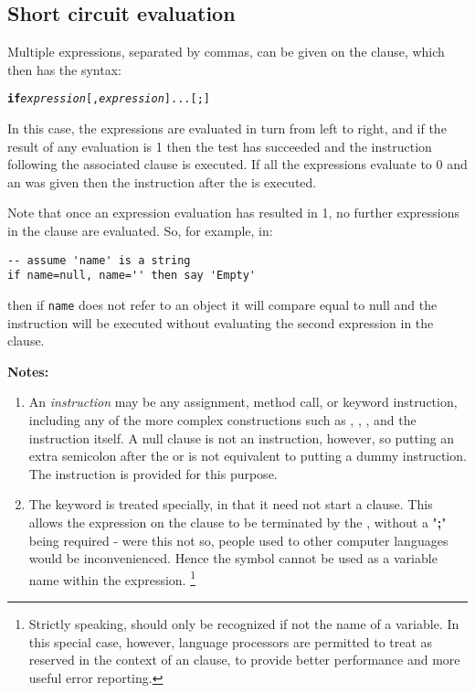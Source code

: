 \subsection{Short circuit evaluation} 
Multiple expressions, separated by commas, can be given on the
 clause, which then has the syntax:
\begin{shaded}
\begin{alltt}
\textbf{if} \emph{expression}[, \emph{expression}]... [;]
\end{alltt}
\end{shaded}
In this case, the expressions are evaluated in turn from left to
right, and if the result of any evaluation is 1 then the test has
succeeded and the instruction following the associated 
clause is executed.
If all the expressions evaluate to 0 and an  was given
then the instruction after the  is executed.
 
Note that once an expression evaluation has resulted in 1, no further
expressions in the clause are evaluated.  So, for example, in:
\begin{lstlisting}
-- assume 'name' is a string
if name=null, name='' then say 'Empty'
\end{lstlisting}
then if \texttt{name} does not refer to an object it will compare equal to
null and the  instruction will be executed without
evaluating the second expression in the  clause.
\begin{shaded}\noindent
\textbf{Notes:}
\begin{enumerate}
\item An \emph{instruction} may be any assignment, method call, or
keyword instruction, including any of the more complex constructions
such as , , , and the 
instruction itself.
A null clause is not an instruction, however, so putting an extra
semicolon after the  or  is not equivalent to
putting a dummy instruction.
The  instruction is provided for this purpose.
\item The keyword  is treated specially, in that it need not start a
clause.
This allows the expression on the  clause to be terminated by
the , without a "\textbf{;}" being required -
were this not so, people used to other computer languages would
be inconvenienced.
Hence the symbol  cannot be used as a variable name within
the expression.
\footnote{
Strictly speaking,  should only be recognized if not
the name of a variable.  In this special case, however, \nr{} language
processors are permitted to treat  as reserved in the
context of an  clause, to provide better performance and
more useful error reporting.
}
\end{enumerate}
\end{shaded}\indent
